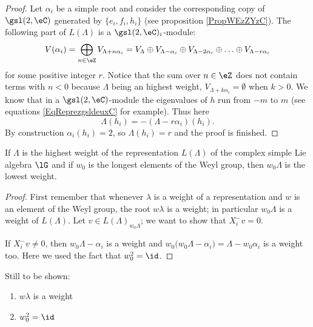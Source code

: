 \begin{proof}
    Let \( \alpha_i\) be a simple root and consider the corresponding copy of \( \gsl(2,\eC)\) generated by \( \{ e_i,f_i,h_i \}\) (see proposition \ref{PropWEzZYzC}). The following part of \( L(\Lambda)\) is a \( \gsl(2,\eC)_i\)-module:
    \begin{equation}
        V(\alpha_i)=\bigoplus_{n\in\eZ}V_{\Lambda+n\alpha_i}=V_{\Lambda}\oplus V_{\Lambda-\alpha_i}\oplus V_{\Lambda-2\alpha_i}\oplus\ldots\oplus V_{\Lambda-r\alpha_i}
    \end{equation}
    for some positive integer \( r\). Notice that the sum over \( n\in\eZ\) does not contain terms with \( n<0\) because \( \Lambda\) being an highest weight, \( V_{\Lambda+k\alpha_i}=\emptyset\) when \( k>0\). We know that in a \( \gsl(2,\eC)\)-module the eigenvalues of \( h\) run from \( -m\) to \( m\) (see equations \eqref{EqReprezgsldeuxC} for example). Thus here
    \begin{equation}
        \Lambda(h_i)=-(\Lambda-r\alpha_i)(h_i).
    \end{equation}
    By construction \( \alpha_i(h_i)=2\), so \( \Lambda(h_i)=r\) and the proof is finished.
\end{proof}

\begin{proposition}
    If \( \Lambda\) is the highest weight of the representation \( L(\Lambda)\) of the complex simple Lie algebra \( \lG\) and if \( w_0\) is the longest elements of the Weyl group, then \( w_0\Lambda\) is the lowest weight.
\end{proposition}

\begin{proof}
    First remember that whenever \( \lambda\) is a weight of a representation and \( w\) is an element of the Weyl group, the root \( w\lambda\) is a weight; in particular \( w_0\Lambda\) is a weight of \( L(\Lambda)\).   Let \( v\in L(\Lambda)_{w_0\Lambda}\); we want to show that \( X_i^-v=0\).

    If \( X_i^-v\neq 0\), then \( w_0\Lambda-\alpha_i\) is a weight and \( w_0\big( w_0\Lambda-\alpha_i \big)=\Lambda-w_0\alpha_i\) is a weight too. Here we used the fact that \( w_0^2=\id\).
\end{proof}

\begin{probleme}
    Still to be shown:
    \begin{enumerate}
        \item
            \( w\lambda\) is a weight
        \item
            \( w_0^2=\id\)
    \end{enumerate}
\end{probleme}

